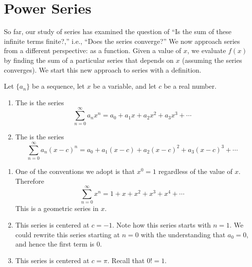 \section{Power Series}\label{sec:power_series}

So far, our study of series has examined the question of ``Is the sum of these infinite terms finite?,'' i.e., ``Does the series converge?'' We now approach series from a different perspective: as a function. Given a value of $x$, we evaluate $f(x)$ by finding the sum of a particular series that depends on $x$ (assuming the series converges). We start this new approach to series with a definition.

{Let $\{a_n\}$ be a sequence, let $x$ be a variable, and let $c$ be a real number.
	\begin{enumerate}
		\item The  is the series
		$$\sum_{n=0}^\infty a_nx^n = a_0+a_1x+a_2x^2+a_3x^3+\dotsb$$
		
		\item The  is the series
		$$\sum_{n=0}^\infty a_n(x-c)^n = a_0+a_1(x-c)+a_2(x-c)^2+a_3(x-c)^3+\dotsb$$
	\end{enumerate}
}

{\begin{enumerate}
	\item One of the conventions we adopt is that $x^0=1$ regardless of the value of $x$. Therefore
	$$\sum_{n=0}^\infty x^n = 1+x+x^2+x^3+x^4+\dotsb$$
	This is a geometric series in $x$.
	
	\item	This series is centered at $c=-1$. Note how this series starts with $n=1$. We could rewrite this series starting at $n=0$ with the understanding that $a_0=0$, and hence the first term is $0$.
	
	\item		This series is centered at $c=\pi$. Recall that $0!=1$.
\end{enumerate}}

